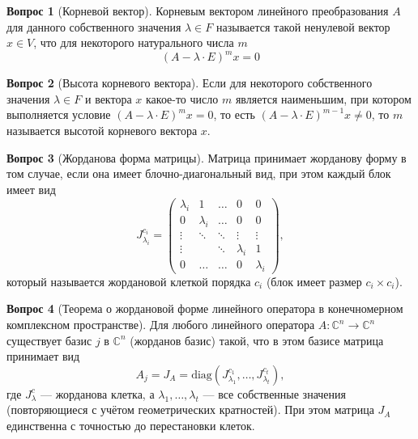 \documentclass[a4paper,11pt]{article}
\theoremstyle{remark}
\theoremstyle{definition}
\newtheorem{question}{Вопрос}
\begin{document}
\begin{question}[Корневой вектор]
Корневым вектором линейного преобразования \(A\) для данного собственного значения \(\lambda \in F\) называется такой ненулевой вектор \(x \in V\), что для некоторого натурального числа \(m\)
\begin{equation*}
 	(A - \lambda \cdot E)^mx = 0
\end{equation*} 
\end{question}


\begin{question}[Высота корневого вектора]
Если для некоторого собственного значения \(\lambda \in F\) и вектора \(x\) какое-то число \(m\) является наименьшим, при котором выполняется условие \((A - \lambda \cdot E)^mx = 0\), то есть \((A - \lambda \cdot E)^{m-1}x \neq 0\), то \(m\) называется высотой корневого вектора \(x\).
\end{question}


\begin{question}[Жорданова форма матрицы]
Матрица принимает жорданову форму в том случае, если она имеет блочно-диагональный вид, при этом каждый блок имеет вид
\begin{equation*}
	J^{c_i}_{\lambda_i} = 
	\begin{pmatrix}
		\lambda_i & 1 & \dots & 0 & 0 \\
		0 & \lambda_i & \dots & 0 & 0 \\
		\vdots & \ddots & \ddots & \vdots & \vdots \\
		\vdots & & \ddots & \lambda_i & 1 \\
		0 & \dots & \dots & 0 & \lambda_i
	\end{pmatrix},
\end{equation*}
который называется жордановой клеткой порядка \(c_i\) (блок имеет размер \(c_i \times c_i\)).
\end{question}


\begin{question}[Теорема о жордановой форме линейного оператора в конечномерном комплексном пространстве]
Для любого линейного оператора \(A: \mathbb{C}^n \rightarrow \mathbb{C}^n\) существует базис \(j\) в \(\mathbb{C}^n\) (жорданов базис) такой, что в этом базисе матрица принимает вид
\begin{equation*}
	A_j = J_A = \mathrm{diag}(J_{\lambda_1}^{c_1}, \dots, J_{\lambda_t}^{c_t}),
\end{equation*}
где \(J_{\lambda}^{c}\) --- жорданова клетка, а \(\lambda_1, \dots, \lambda_t\) --- все собственные значения (повторяющиеся с учётом геометрических кратностей). При этом матрица \(J_A\) единственна с точностью до перестановки клеток.
\end{question}
\end{document}
